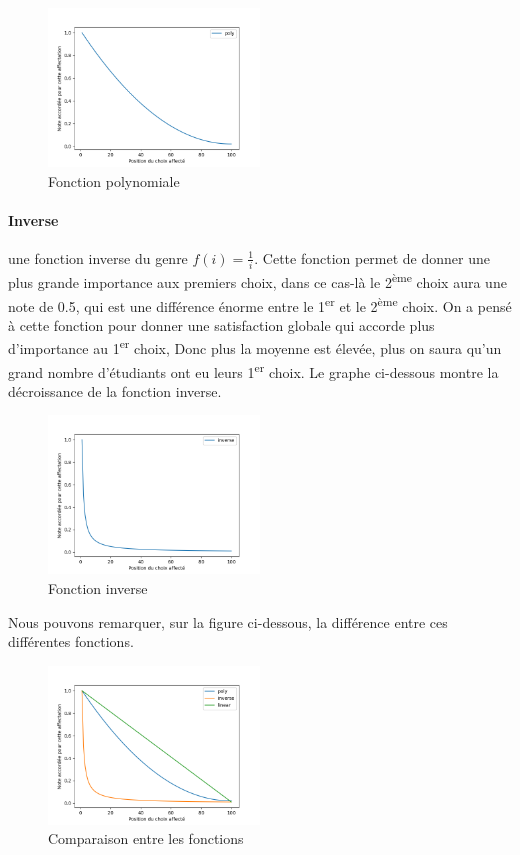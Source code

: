 \documentclass[12pt,titlepage]{article}
\begin{document}
\begin{figure}[!h]
\centering
\includegraphics[width = 0.5\textwidth]{img/poly.png}
\caption{Fonction polynomiale}
\end{figure}

\paragraph{Inverse} une fonction inverse du genre $f(i) = \frac{1}{i}$. Cette fonction permet de donner une plus grande importance aux premiers choix, dans ce cas-là le 2\textsuperscript{ème} choix aura une note de 0.5, qui est une différence énorme entre le 1\textsuperscript{er} et le 2\textsuperscript{ème} choix. On a pensé à cette fonction pour donner une satisfaction globale qui accorde plus d'importance au 1\textsuperscript{er} choix, Donc plus la moyenne est élevée, plus on saura qu'un grand nombre d'étudiants ont eu leurs 1\textsuperscript{er} choix. Le graphe ci-dessous montre la décroissance de la fonction inverse.

\begin{figure}[!h]
\centering
\includegraphics[width = 0.5\textwidth]{img/inverse.png}
\caption{Fonction inverse}
\end{figure}

Nous pouvons remarquer, sur la figure ci-dessous, la différence entre ces différentes fonctions.

\begin{figure}[!h]
  \centering
  \includegraphics[width = 0.5\textwidth]{img/comparatif.png}
  \caption{Comparaison entre les fonctions}
\end{figure}
\end{document}
